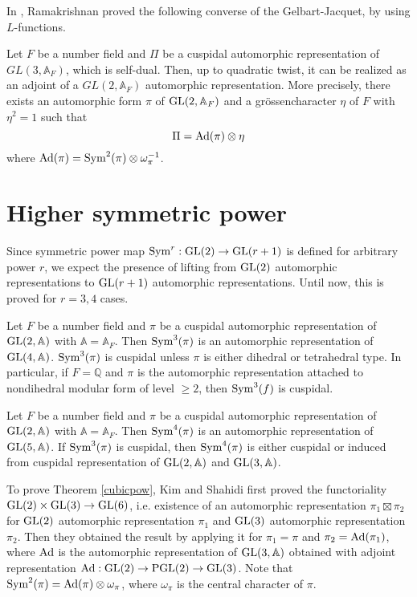 In \cite{ramakrishnan2014exercise}, Ramakrishnan proved the following converse of the Gelbart-Jacquet, by using $L$-functions.
\begin{theorem}
Let $F$ be a number field and $\Pi$ be a cuspidal automorphic representation of $GL(3, \mathbb{A}_{F})$, which is self-dual.
Then, up to quadratic twist, it can be realized as an adjoint of a $GL(2, \mathbb{A}_{F})$ automorphic representation.
More precisely, there exists an automorphic form $\pi$ of $\operatorname{\mathrm{GL}}(2, \mathbb{A}_{F})$ and a gr\"ossencharacter $\eta$ of $F$ with $\eta^{2} = 1$ such that
$$
\Pi = \operatorname{\mathrm{Ad}}(\pi) \otimes \eta
$$
where $\operatorname{\mathrm{Ad}}(\pi) = \mathrm{Sym}^{2}(\pi) \otimes \omega_{\pi}^{-1}$.
\end{theorem}


\section{Higher symmetric power}
Since symmetric power map $\mathrm{Sym}^{r}:\operatorname{\mathrm{GL}}(2) \to \operatorname{\mathrm{GL}}(r+1)$ is defined for arbitrary power $r$, we expect the presence of lifting from $\operatorname{\mathrm{GL}}(2)$ automorphic representations to $\operatorname{\mathrm{GL}}(r+1)$ automorphic representations.
Until now, this is proved for $r = 3, 4$ cases.

\begin{theorem}
\label{cubicpow}
Let $F$ be a number field and $\pi$ be a cuspidal automorphic representation of $\operatorname{\mathrm{GL}}(2, \mathbb{A})$ with $\mathbb{A} = \mathbb{A}_{F}$.
Then $\mathrm{Sym}^{3}(\pi)$ is an automorphic representation of $\operatorname{\mathrm{GL}}(4, \mathbb{A})$.
$\mathrm{Sym}^{3}(\pi)$ is cuspidal unless $\pi$ is either dihedral or tetrahedral type.
In particular, if $F = \mathbb{Q}$ and $\pi$ is the automorphic representation attached to nondihedral modular form of level $\geq 2$, then $\mathrm{Sym}^{3}(f)$ is cuspidal.
\end{theorem}


\begin{theorem}
\label{quarticpow}
Let $F$ be a number field and $\pi$ be a cuspidal automorphic representation of $\operatorname{\mathrm{GL}}(2, \mathbb{A})$ with $\mathbb{A} = \mathbb{A}_{F}$.
Then $\mathrm{Sym}^{4}(\pi)$ is an automorphic representation of $\operatorname{\mathrm{GL}}(5, \mathbb{A})$.
If $\mathrm{Sym}^{3}(\pi)$ is cuspidal, then $\mathrm{Sym}^{4}(\pi)$ is either cuspidal or induced from cuspidal representation of $\operatorname{\mathrm{GL}}(2, \mathbb{A})$ and $\operatorname{\mathrm{GL}}(3, \mathbb{A})$.
\end{theorem}

To prove Theorem \ref{cubicpow}, Kim and Shahidi first proved the functoriality $\operatorname{\mathrm{GL}}(2) \times \operatorname{\mathrm{GL}}(3) \to \operatorname{\mathrm{GL}}(6)$, i.e. existence of an automorphic representation $\pi_{1} \boxtimes \pi_{2}$ for $\operatorname{\mathrm{GL}}(2)$ automorphic representation $\pi_{1}$ and $\operatorname{\mathrm{GL}}(3)$ automorphic representation $\pi_{2}$.
Then they obtained the result by applying it for $\pi_{1} = \pi$ and $\pi_{2}  = \operatorname{\mathrm{Ad}}(\pi_{1})$, where $\operatorname{\mathrm{Ad}}$ is the automorphic representation of $\operatorname{\mathrm{GL}}(3, \mathbb{A})$ obtained with adjoint representation $\operatorname{\mathrm{Ad}}: \operatorname{\mathrm{GL}}(2) \to \operatorname{\mathrm{PGL}}(2) \to \operatorname{\mathrm{GL}}(3)$.
Note that $\mathrm{Sym}^{2}(\pi) = \operatorname{\mathrm{Ad}}(\pi) \otimes \omega_{\pi}$, where $\omega_{\pi}$ is the central character of $\pi$. 

